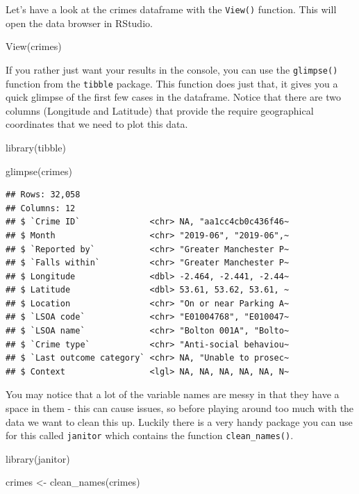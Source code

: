 \documentclass[
  krantz2]{krantz}
\makeatletter
\newenvironment{Shaded}{\begin{snugshade}}{\end{snugshade}}
\newcommand{\FunctionTok}[1]{\textcolor[rgb]{0,0,0}{#1}}
\newcommand{\NormalTok}[1]{#1}
\newcommand{\OtherTok}[1]{\textcolor[rgb]{0.37,0.37,0.37}{#1}}
\newenvironment{kframe}{%
\medskip{}
\setlength{\fboxsep}{.8em}
 \def\at@end@of@kframe{}%
 \ifinner\ifhmode%
  \def\at@end@of@kframe{\end{minipage}}%
  \begin{minipage}{\columnwidth}%
 \fi\fi%
 \def\FrameCommand##1{\hskip\@totalleftmargin \hskip-\fboxsep
 \colorbox{shadecolor}{##1}\hskip-\fboxsep
     \hskip-\linewidth \hskip-\@totalleftmargin \hskip\columnwidth}%
 \MakeFramed {\advance\hsize-\width
   \@totalleftmargin\z@ \linewidth\hsize
   \@setminipage}}%
 {\par\unskip\endMakeFramed%
 \at@end@of@kframe}
\renewenvironment{Shaded}{\begin{kframe}}{\end{kframe}}
\makeatother
\begin{document}
Let's have a look at the crimes dataframe with the \texttt{View()} function. This will open the data browser in RStudio.

\begin{Shaded}
\begin{Highlighting}[]
\FunctionTok{View}\NormalTok{(crimes)}
\end{Highlighting}
\end{Shaded}

If you rather just want your results in the console, you can use the \texttt{glimpse()} function from the \texttt{tibble} package. This function does just that, it gives you a quick glimpse of the first few cases in the dataframe. Notice that there are two columns (Longitude and Latitude) that provide the require geographical coordinates that we need to plot this data.

\begin{Shaded}
\begin{Highlighting}[]
\FunctionTok{library}\NormalTok{(tibble)}

\FunctionTok{glimpse}\NormalTok{(crimes)}
\end{Highlighting}
\end{Shaded}

\begin{verbatim}
## Rows: 32,058
## Columns: 12
## $ `Crime ID`              <chr> NA, "aa1cc4cb0c436f46~
## $ Month                   <chr> "2019-06", "2019-06",~
## $ `Reported by`           <chr> "Greater Manchester P~
## $ `Falls within`          <chr> "Greater Manchester P~
## $ Longitude               <dbl> -2.464, -2.441, -2.44~
## $ Latitude                <dbl> 53.61, 53.62, 53.61, ~
## $ Location                <chr> "On or near Parking A~
## $ `LSOA code`             <chr> "E01004768", "E010047~
## $ `LSOA name`             <chr> "Bolton 001A", "Bolto~
## $ `Crime type`            <chr> "Anti-social behaviou~
## $ `Last outcome category` <chr> NA, "Unable to prosec~
## $ Context                 <lgl> NA, NA, NA, NA, NA, N~
\end{verbatim}

You may notice that a lot of the variable names are messy in that they have a space in them - this can cause issues, so before playing around too much with the data we want to clean this up. Luckily there is a very handy package you can use for this called \texttt{janitor} which contains the function \texttt{clean\_names()}.

\begin{Shaded}
\begin{Highlighting}[]
\FunctionTok{library}\NormalTok{(janitor)}

\NormalTok{crimes }\OtherTok{\textless{}{-}} \FunctionTok{clean\_names}\NormalTok{(crimes)}
\end{Highlighting}
\end{Shaded}
\end{document}
